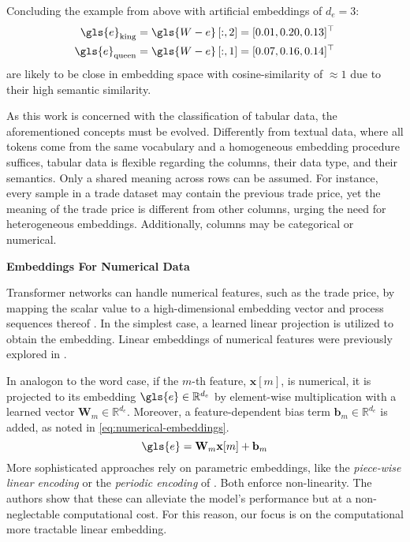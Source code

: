 Concluding the example from above with artificial embeddings of $d_e=3$:
\begin{equation}
    \begin{aligned}
        \gls{e}_{\mathrm{king}}  & =\gls{W-e}\left[:,2\right] = [0.01, 0.20, 0.13]^{\top} \\
        \gls{e}_{\mathrm{queen}} & =\gls{W-e}\left[:,1\right] = [0.07, 0.16, 0.14]^{\top} \\
    \end{aligned}
\end{equation}
are likely to be close in embedding space with cosine-similarity of $\approx 1$ due to their high semantic similarity.

As this work is concerned with the classification of tabular data, the aforementioned concepts must be evolved. Differently from textual data, where all tokens come from the same vocabulary and a homogeneous embedding procedure suffices, tabular data is flexible regarding the columns, their data type, and their semantics. Only a shared meaning across rows can be assumed. For instance, every sample in a trade dataset may contain the previous trade price, yet the meaning of the trade price is different from other columns, urging the need for heterogeneous embeddings. Additionally, columns may be categorical or numerical.

\textbf{Embeddings For Numerical Data}

Transformer networks can handle numerical features, such as the trade price, by mapping the scalar value to a high-dimensional embedding vector and process sequences thereof \autocite[][24993]{gorishniyEmbeddingsNumericalFeatures2022}. In the simplest case, a learned linear projection is utilized to obtain the embedding. Linear embeddings of numerical features were previously explored in \textcites[][28745]{kossenSelfAttentionDatapointsGoing2021}[][4]{somepalliSaintImprovedNeural2021}[][18935]{gorishniyRevisitingDeepLearning2021}.

In analogon to the word case, if the $m$-th feature, $\mathbf{x}[m]$, is numerical, it is projected to its embedding $\gls{e} \in \mathbb{R}^{d_e}$ by element-wise multiplication with a learned vector $\mathbf{W}_m \in \mathbb{R}^{d_{e}}$. Moreover, a feature-dependent bias term $\mathbf{b}_m \in \mathbb{R}^{d_{e}}$ is added, as noted in \cref{eq:numerical-embeddings}.
\begin{equation}
    \gls{e}= \mathbf{W}_m \mathbf{x}[m] +\mathbf{b}_m
    \label{eq:numerical-embeddings}
\end{equation}
More sophisticated approaches rely on parametric embeddings, like the \emph{piece-wise linear encoding} or the \emph{periodic encoding} of \textcite[][24993--24995]{gorishniyEmbeddingsNumericalFeatures2022}. Both enforce non-linearity. The authors show that these can alleviate the model's performance but at a non-neglectable computational cost. For this reason, our focus is on the computational more tractable linear embedding.

